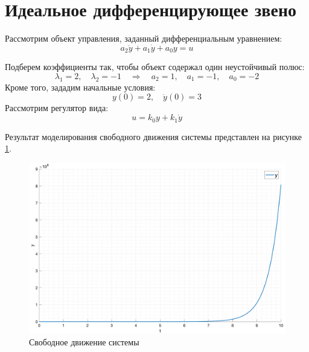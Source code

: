 \section{Идеальное дифференцирующее звено}

Рассмотрим объект управления, заданный дифференциальным уравнением:
\begin{equation}
    a_2 \ddot{y} + a_1 \dot{y} + a_0 y = u
\end{equation}

Подберем коэффициенты так, чтобы объект содержал один неустойчивый полюс: 
\begin{equation}
    \lambda_1 = 2,\quad\lambda_2 = -1 \quad\Rightarrow \quad a_2 = 1,\quad a_1 = -1, \quad a_0 = -2
\end{equation}
Кроме того, зададим начальные условия:
\begin{equation}
    y(0) = 2,\quad\dot{y}(0) = 3
\end{equation}
Рассмотрим регулятор вида: 
\begin{equation}
    u = k_0y + k_1\dot{y}
    \label{eq:conctoller1}
\end{equation}

Результат моделирования свободного движения системы представлен на рисунке \ref{fig:task1_free}.

\begin{figure}[ht!]
    \centering
    \includegraphics[width=\textwidth]{"media/plots/task1_freeout.png"}
    \caption{Свободное движение системы}
    \label{fig:task1_free}
\end{figure}

